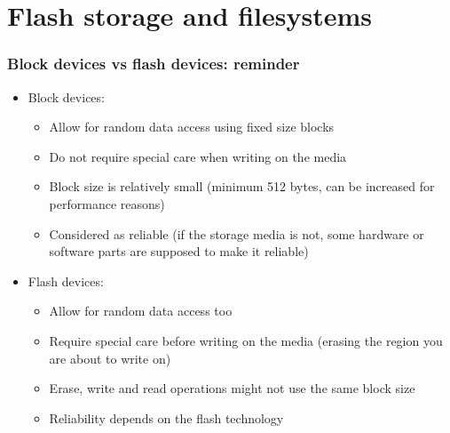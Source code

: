 \section{Flash storage and filesystems}

\begin{frame}
  \frametitle{Block devices vs flash devices: reminder}
  \begin{itemize}
  \item Block devices:
    \begin{itemize}
    \item Allow for random data access using fixed size blocks
    \item Do not require special care when writing on the media
    \item Block size is relatively small (minimum 512 bytes, can be
      increased for performance reasons)
    \item Considered as reliable (if the storage media is not, some
      hardware or software parts are supposed to make it reliable)
    \end{itemize}
  \item Flash devices:
    \begin{itemize}
    \item Allow for random data access too
    \item Require special care before writing on the media (erasing
      the region you are about to write on)
    \item Erase, write and read operations might not use the same block
      size
    \item Reliability depends on the flash technology
    \end{itemize}
  \end{itemize}
\end{frame}

